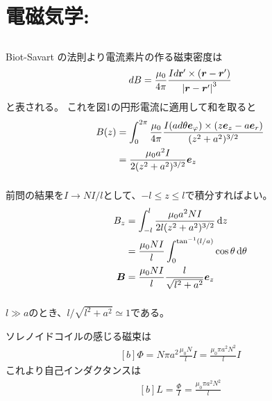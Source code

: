 \documentclass[../ap_2014.tex]{subfiles}
\begin{document}
\setcounter{chapter}{1}
\chapter{電磁気学:}
\section{}
\subsection{}
Biot-Savart の法則より電流素片の作る磁束密度は
\begin{equation}\begin{aligned}[b]
    dB = \frac{\mu_0}{4\pi}\frac{Id\vb{r}'\times(\vb*{r}-\vb*{r}')}{\abs{\vb*{r}-\vb*{r}'}^3}
\end{aligned}\end{equation}
と表される。
これを図1の円形電流に適用して和を取ると
\begin{equation}\begin{aligned}[b]
    B(z) &= \int_{0}^{2\pi}\frac{\mu_0}{4\pi}\frac{I(ad\theta \vb*{e}_\varphi)\times(z\vb*{e}_z-a\vb*{e}_r)}{(z^2+a^2)^{3/2}}\\
    &= \frac{\mu_0 a^2 I}{2(z^2+a^2)^{3/2}}\vb*{e}_z
\end{aligned}\end{equation}

\subsection{}
前問の結果を\(I\to NI/l\)として、\(-l\leq z\leq l\)で積分すればよい。
\begin{equation}\begin{aligned}[b]
    B_z &= \int_{-l}^l\frac{\mu_0 a^2 NI}{2l(z^2+a^2)^{3/2}}\dd{z}\\
    &=\frac{\mu_0 NI}{l}\int_{0}^{\tan^{-1}(l/a)} \cos\theta \,\dd\theta\\
    \vb*{B}&=\frac{\mu_0 NI}{l}\frac{l}{\sqrt{l^2+a^2}}\vb*{e}_z
\end{aligned}\end{equation}

\subsection{}
\(l\gg a\)のとき、\(l/\sqrt{l^2+a^2}\simeq 1\)である。

ソレノイドコイルの感じる磁束は
\begin{equation}\begin{aligned}[b]
    \Phi = N\pi a^2\frac{\mu_0N}{l}I = \frac{\mu_0\pi a^2N^2}{l}I
\end{aligned}\end{equation}
これより自己インダクタンスは
\begin{equation}\begin{aligned}[b]
    L = \frac{\Phi}{I}=\frac{\mu_0\pi a^2N^2}{l}
\end{aligned}\end{equation}
\end{document}
